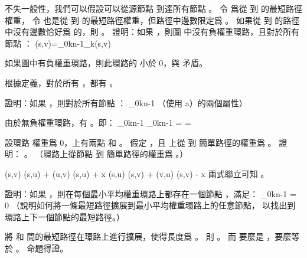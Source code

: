 不失一般性，我們可以假設可以從源節點  到達所有節點 。
令  爲從  到  的最短路徑權重，
令  也是從  到  的最短路徑權重，但路徑中邊數限定爲 。
如果從  到  的路徑中沒有邊數恰好爲  的，則 。
\startigBase[a]\startitem
證明：如果 ，則圖  中沒有負權重環路，且對於所有節點 ：
\startformula
\delta(s,v)=\min_{0\le k\le n-1}\delta_k(s,v)
\stopformula
\stopitem\stopigBase

\startANSWER
如果圖中有負權重環路，則此環路的 \m{\mu} 小於 0，與  矛盾。

根據定義，對於所有 ，都有 。
\stopANSWER

\startigBase[continue]\startitem
證明：如果 ，則對於所有節點 ：
\startformula
\max_{0\le k\le n-1} 
\stopformula
（\hint 使用 a）的兩個屬性）
\stopitem\stopigBase

\startANSWER
由於無負權重環路，有 。即：
\startformula\startmathalignment
\NC \max_{0\le k\le n-1} \ge \NC \max_{0\le k\le n-1} \NR
\NC \ge \NC {} \NR
\NC = \NC {} \NR
\NC =  \NR
\stopmathalignment\stopformula
\stopANSWER

\startigBase[continue]\startitem
設環路  權重爲 0，上有兩點  和 。
假定 ，且  上從  到  簡單路徑的權重爲 。
證明： 。
（\hint 環路上從節點  到  簡單路徑的權重爲 。）
\stopitem\stopigBase

\startANSWER
\startformula\startmathalignment
\NC \delta(s,v) \le \NC \delta(s,u) + \delta(u,v) \le \delta(s,u) + x \NR
\NC \delta(s,u) \le \NC \delta(s,v) + \delta(v,u) \le \delta(s,v) - x \NR
\stopmathalignment\stopformula
兩式聯立可知 。
\stopANSWER

\startigBase[continue]\startitem
證明：如果 ，則在每個最小平均權重環路上都存在一個節點 ，滿足：
\startformula
\max_{0\le k\le n-1} = 0
\stopformula
（\hint 說明如何將一條最短路徑擴展到最小平均權重環路上的任意節點，
以找出到環路上下一個節點的最短路徑。）
\stopitem\stopigBase

\startANSWER
將  和  間的最短路徑在環路上進行擴展，使得長度爲 。
則 。
而  要麼是 \m{\infty}，要麼等於 。
命題得證。
\stopANSWER

